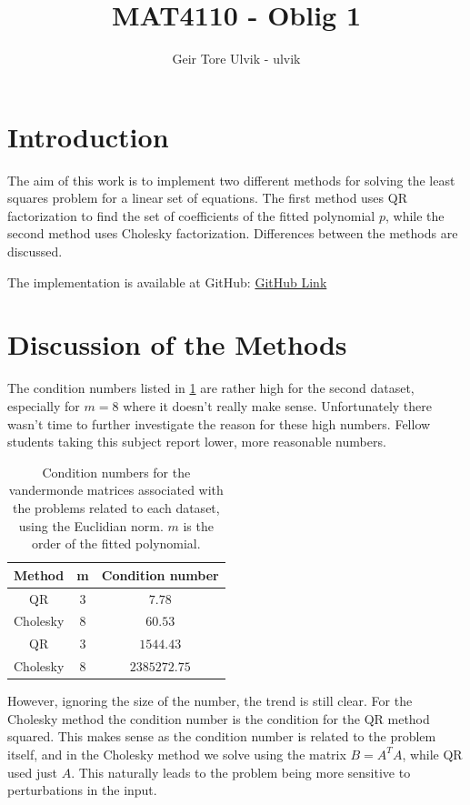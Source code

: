 \documentclass[12pt]{article}
\begin{document}
\title{MAT4110 - Oblig 1}
\author{Geir Tore Ulvik - ulvik}
\maketitle

\section{Introduction}
The aim of this work is to implement two different methods for solving
the least squares problem for a linear set of equations. The first method
uses QR factorization to find the set of coefficients of the fitted polynomial $p$,
while the second method uses Cholesky factorization.
Differences between the methods are discussed.

The implementation is available at GitHub: 
\href{https://github.com/geirtul/mat4110/tree/master/oblig1}{GitHub Link}
\section{Discussion of the Methods}
The condition numbers listed in \ref{tab:condition} are rather high for the second
dataset, especially for $m = 8$ where it doesn't really make sense.
Unfortunately there wasn't time to further investigate the reason for these high numbers.
Fellow students taking this subject report lower, more reasonable numbers.
\begin{table}[h]
\center
\begin{tabular}{c c c}
	Method & m & Condition number \\
	\hline
	QR & $3$ & $7.78$ \\
	Cholesky & $8$ & $60.53$\\
	QR & $3$ & $1544.43$ \\
	Cholesky & $8$ & $2385272.75$\\
\end{tabular}
	\caption{Condition numbers for the vandermonde matrices associated with the problems
		related to each dataset, using the Euclidian norm. 
		$m$ is the order of the fitted polynomial.}
\label{tab:condition}
\end{table}

However, ignoring the size of the number, the trend is still clear. For the Cholesky
method the condition number is the condition for the QR method squared.
This makes sense as the condition number is related to the problem itself, and in
the Cholesky method we solve using the matrix $B = A^TA$, while QR used just $A$.
This naturally leads to the problem being more sensitive to perturbations in the input.
\end{document}
